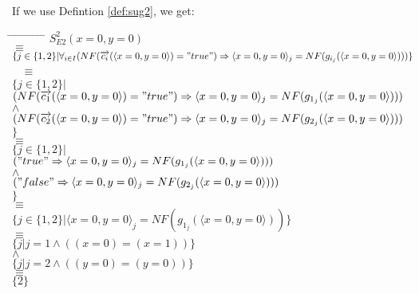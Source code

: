 \documentclass[a4paper,10pt]{article}
\theoremstyle{plain}
\theoremstyle{definition}
\newcommand{\ovr}{\overrightarrow}
\begin{document}
\begin{defn}
\begin{example} [Let $E2$ be]
\begin{verbatim}
\end{verbatim}
\end{example}
If we use Defintion \ref{def:sug2}, we get:
\begin{tabbing}
\hspace*{5.mm} \= \hspace*{5.mm} \= \hspace*{5.mm} \= \hspace*{5.mm} \= \hspace*{5.mm} \= \hspace*{5.mm}  \= \hspace*{5.mm}  \= \hspace*{5.mm}  \= \hspace*{5.mm} \= \hspace*{5.mm} \= \hspace*{5.mm}\kill
\> \> $S_{E2}^2(x =0, y=0)$\\
\> $\equiv$\\
\> \> $\lbrace j \in \lbrace 1, 2 \rbrace \vert \forall_{i\in I} (NF(\ovr{c_i}( \langle x = 0, y = 0\rangle ) = "true") \Rightarrow  \langle x = 0, y = 0\rangle_j = NF(g_{i_j}( \langle x = 0, y = 0\rangle)))\rbrace $\\\
\> $\equiv$ \\
\> \>$\lbrace j \in \lbrace 1, 2 \rbrace \vert $ \\
\> \> \> $(NF(\ovr{c_1}( \langle x = 0, y = 0\rangle ) = "true") \Rightarrow  \langle x = 0, y = 0\rangle_j = NF(g_{1_j}( \langle x = 0, y = 0\rangle))) $\\
\> \> \> $\wedge$ \\
\> \> \> $ (NF(\ovr{c_2}( \langle x = 0, y = 0\rangle ) = "true") \Rightarrow  \langle x = 0, y = 0\rangle_j = NF(g_{2_j}( \langle x = 0, y = 0\rangle))) $ \\
\> \>$
\rbrace $\\
\> $\equiv$ \\
\> \> $\lbrace j \in \lbrace 1, 2 \rbrace \vert $\\
\> \> \> $("true" \Rightarrow  \langle x = 0, y = 0\rangle_j = NF(g_{1_j}( \langle x = 0, y = 0\rangle)))$ \\
\> \> \> $\wedge$ \\
\> \> \> $("false" \Rightarrow  \langle x = 0, y = 0\rangle_j = NF(g_{2_j}( \langle x = 0, y = 0\rangle)))$ \\
\> \> $\rbrace $\\
\> $\equiv$ \\
\> \> $\lbrace j \in \lbrace 1, 2 \rbrace \vert 
\langle x = 0, y = 0\rangle_j = NF(g_{1_j}( \langle x = 0, y = 0\rangle))
\rbrace $\\
\> $\equiv$\\
\> \> $\lbrace j \vert j = 1 \wedge
((x = 0)  = (x = 1)) \rbrace $\\
\> \> $\wedge$ \\
\> \> $\lbrace j \vert j = 2 \wedge
((y = 0)  = (y = 0)) \rbrace $\\
\> $\equiv $ \\
\> \> $\lbrace 2 \rbrace$ \\
\end{tabbing}


\end{defn}
\end{document}
